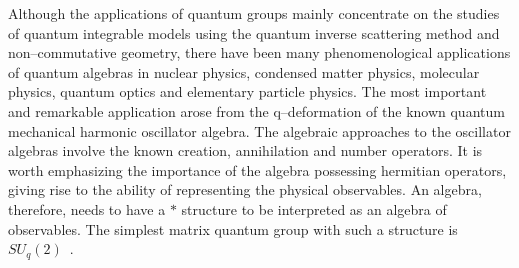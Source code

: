 \documentclass[a4paper,12pt]{article}
\numberwithin{equation}{section}
\begin{document}
Although the applications of quantum groups mainly concentrate on the studies of
 quantum integrable models using the quantum inverse scattering method and
 non--commutative geometry, there have been many phenomenological applications of
 quantum algebras in nuclear physics, condensed matter physics, molecular physics,
 quantum optics and elementary particle physics. The most important and remarkable
 application arose from the q--deformation of the known quantum mechanical harmonic
 oscillator algebra. The algebraic approaches to the oscillator algebras involve the
 known creation, annihilation and number operators. It is worth emphasizing the
 importance of the algebra possessing hermitian operators, giving rise to the ability
 of representing the physical observables. An algebra, therefore, needs to have a
 $\ast$ structure to be interpreted as an algebra of observables.
The simplest matrix quantum group with such a structure is $SU_q (2)$~\cite{Wor}.
\end{document}
